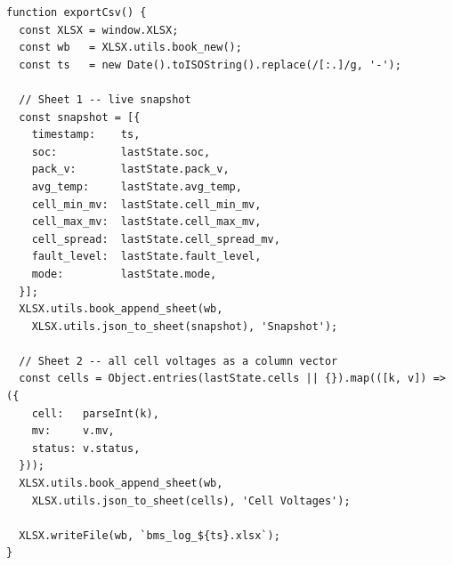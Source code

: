 \begin{lstlisting}[caption={XLSX data export --- snapshot and cell voltage sheet builder}, label={lst:js-export}]
function exportCsv() {
  const XLSX = window.XLSX;
  const wb   = XLSX.utils.book_new();
  const ts   = new Date().toISOString().replace(/[:.]/g, '-');

  // Sheet 1 -- live snapshot
  const snapshot = [{
    timestamp:    ts,
    soc:          lastState.soc,
    pack_v:       lastState.pack_v,
    avg_temp:     lastState.avg_temp,
    cell_min_mv:  lastState.cell_min_mv,
    cell_max_mv:  lastState.cell_max_mv,
    cell_spread:  lastState.cell_spread_mv,
    fault_level:  lastState.fault_level,
    mode:         lastState.mode,
  }];
  XLSX.utils.book_append_sheet(wb,
    XLSX.utils.json_to_sheet(snapshot), 'Snapshot');

  // Sheet 2 -- all cell voltages as a column vector
  const cells = Object.entries(lastState.cells || {}).map(([k, v]) => ({
    cell:   parseInt(k),
    mv:     v.mv,
    status: v.status,
  }));
  XLSX.utils.book_append_sheet(wb,
    XLSX.utils.json_to_sheet(cells), 'Cell Voltages');

  XLSX.writeFile(wb, `bms_log_${ts}.xlsx`);
}
\end{lstlisting}
